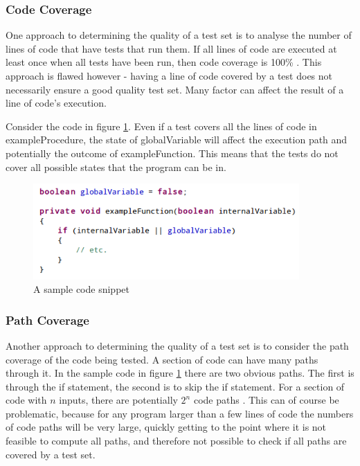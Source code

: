 \subsubsection{Code Coverage}


One approach to determining the quality of a test set is to analyse the number of lines of code that have tests that run them. If all lines of code are executed at least once when all tests have been run, then code coverage is 100\% \citep{something}. This approach is flawed however - having a line of code covered by a test does not necessarily ensure a good quality test set. Many factor can affect the result of a line of code's execution. 

Consider the code in figure \ref{sampleCoverageCode}. Even if a test covers all the lines of code in exampleProcedure, the state of globalVariable will affect the execution path and potentially the outcome of exampleFunction. This means that the tests do not cover all possible states that the program can be in.

\begin{figure}
	\begin{center}
		\includegraphics[width=4in]{figures/code_coverage.png}
	\end{center}
\caption{A sample code snippet}
\label{sampleCoverageCode}
\end{figure}

\subsubsection{Path Coverage}

Another approach to determining the quality of a test set is to consider the path coverage of the code being tested. A section of code can have many paths through it. In the sample code in figure \ref{sampleCoverageCode} there are two obvious paths. The first is through the if statement, the second is to skip the if statement. For a section of code with $n$ inputs, there are potentially $2^n$ code paths \cite{something}. This can of course be problematic, because for any program larger than a few lines of code the numbers of code paths will be very large, quickly getting to the point where it is not feasible to compute all paths, and therefore not possible to check if all paths are covered by a test set.

